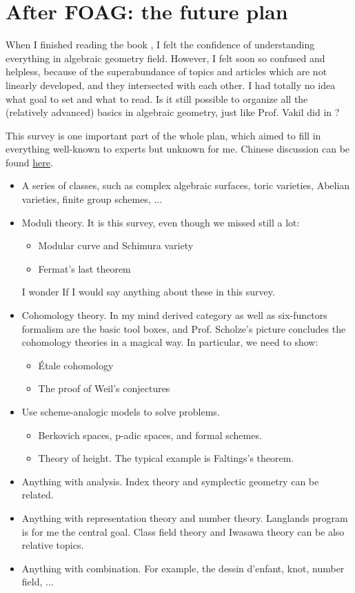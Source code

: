 \section{After FOAG: the future plan}
When I finished reading the book \cite{FOAG}, I felt the confidence of understanding everything in algebraic geometry field. However, I felt soon so confused and helpless, because of the superabundance of topics and articles which are not linearly developed, and they intersected with each other. I had totally no idea what goal to set and what to read. Is it still possible to organize all the (relatively advanced) basics in algebraic geometry, just like Prof. Vakil did in \cite{FOAG}?

This survey is one important part of the whole plan, which aimed to fill in everything well-known to experts but unknown for me. Chinese discussion can be found \href{https://www.zhihu.com/question/318263266}{here}.

\begin{itemize}
\item A series of classes, such as complex algebraic surfaces, toric varieties, Abelian varieties, finite group schemes, ...
\item Moduli theory. It is this survey, even though we missed still a lot:
\begin{itemize}
\item Modular curve and Schimura variety
\item Fermat's last theorem
\end{itemize}
I wonder If I would say anything about these in this survey.
\item Cohomology theory. In my mind derived category as well as six-functors formalism are the basic tool boxes, and Prof. Scholze's picture concludes the cohomology theories in a magical way. In particular, we need to show:
\begin{itemize}
\item Étale cohomology
\item The proof of Weil's conjectures
\end{itemize}
\item Use scheme-analogic models to solve problems.
\begin{itemize}
\item Berkovich spaces, p-adic spaces, and formal schemes.
\item Theory of height. The typical example is Faltings's theorem. 
\end{itemize}
\item Anything with analysis. Index theory and symplectic geometry can be related.
\item Anything with representation theory and number theory. Langlands program is for me the central goal. Class field theory and Iwasawa theory can be also relative topics.
\item Anything with combination. For example, the dessin d'enfant, knot, number field, ...
\end{itemize}